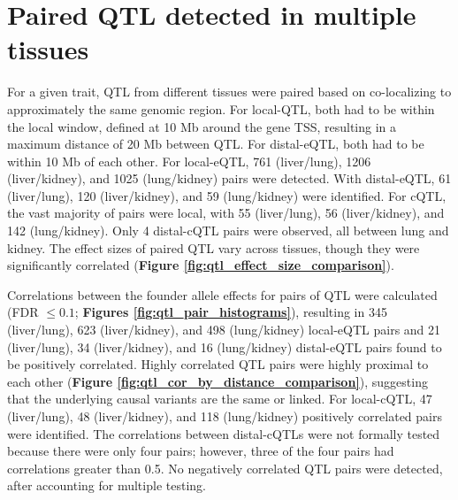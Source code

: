 \documentclass[9pt,twocolumn,twoside]{gsajnl}
\begin{document}
\section{Paired QTL detected in multiple tissues}

For a given trait, QTL from different tissues were paired based on co-localizing to approximately the same genomic region. For local-QTL, both had to be within the local window, defined at 10 Mb around the gene TSS, resulting in a maximum distance of 20 Mb between QTL. For distal-eQTL, both had to be within 10 Mb of each other. 
For local-eQTL, 761 (liver/lung), 1206 (liver/kidney), and 1025 (lung/kidney) pairs were detected. With distal-eQTL, 61 (liver/lung), 120 (liver/kidney), and 59 (lung/kidney) were identified. For cQTL, the vast majority of pairs were local, with 55 (liver/lung), 56 (liver/kidney), and 142 (lung/kidney). Only 4 distal-cQTL pairs were observed, all between lung and kidney. The effect sizes of paired QTL vary across tissues, though they were significantly correlated (\textbf{Figure \ref{fig:qtl_effect_size_comparison}}).

Correlations between the founder allele effects for pairs of QTL were calculated (FDR $\le 0.1$; \textbf{Figures \ref{fig:qtl_pair_histograms}}), resulting in 345 (liver/lung), 623 (liver/kidney), and 498 (lung/kidney) local-eQTL pairs and 21 (liver/lung), 34 (liver/kidney), and 16 (lung/kidney) distal-eQTL pairs found to be positively correlated. Highly correlated QTL pairs were highly proximal to each other (\textbf{Figure \ref{fig:qtl_cor_by_distance_comparison}}), suggesting that the underlying causal variants are the same or linked. For local-cQTL, 47 (liver/lung), 48 (liver/kidney), and 118 (lung/kidney) positively correlated pairs were identified. The correlations between distal-cQTLs were not formally tested because there were only four pairs; however, three of the four pairs had correlations greater than 0.5. No negatively correlated QTL pairs were detected, after accounting for multiple testing.
\end{document}
